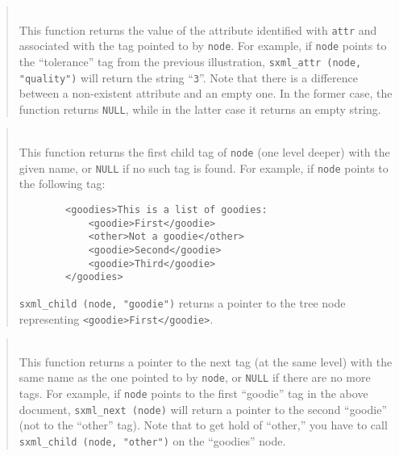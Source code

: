 \begin{quote}
\noindent\hspace{-0.35in}{\tt char *sxml\_attr (sxml\_t node,
const char *attr); }\\ \hspace{0in}
This function returns the value of the attribute identified with {\tt attr}
and associated with the tag pointed to by {\tt node}.
For example, if {\tt node} points to the ``tolerance'' tag from
the previous illustration, {\tt sxml\_attr (node, "quality")} will return
the string ``{\tt 3}''.
Note that there is a difference between a non-existent attribute and an
empty one.
In the former case, the function returns {\tt NULL}, while in the latter
case it returns an empty string.
\end{quote}

\begin{quote}
\noindent\hspace{-0.35in}{\tt sxml\_t sxml\_child (sxml\_t node, const char *name); }\\ \hspace{0in}
This function returns the first child tag of {\tt node}
(one level deeper) with the given name, or {\tt NULL} if no such tag is
found.
For example, if {\tt node} points to the following tag:
\begin{verbatim}
        <goodies>This is a list of goodies:
            <goodie>First</goodie>
            <other>Not a goodie</other>
            <goodie>Second</goodie>
            <goodie>Third</goodie>
        </goodies>
\end{verbatim}
\noindent
{\tt sxml\_child (node, "goodie")} returns a pointer to the tree node
representing
{\tt <goodie>First</goodie>}.
\end{quote}

\begin{quote}
\noindent\hspace{-0.35in}{\tt sxml\_t sxml\_next (sxml\_t node); }\\ \hspace{0in}
This function returns a pointer to the next tag (at the same level)
with the same name as the one pointed to by {\tt node}, or {\tt NULL} if there
are no more tags.
For example, if {\tt node} points to the first ``goodie'' tag in the above
document, {\tt sxml\_next (node)} will return a pointer to the second
``goodie'' (not to the ``other'' tag).
Note that to get hold of ``other,''
you have to call {\tt sxml\_child~(node,~"other")} on the ``goodies'' node.
\end{quote}

